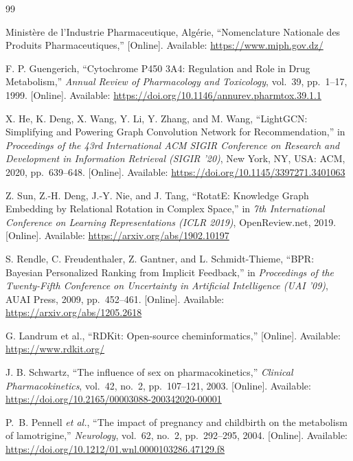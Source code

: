 \begin{thebibliography}{99}

Ministère de l'Industrie Pharmaceutique, Algérie,
``Nomenclature Nationale des Produits Pharmaceutiques,''
[Online]. Available: \url{https://www.miph.gov.dz/}

F. P. Guengerich,
``Cytochrome P450 3A4: Regulation and Role in Drug Metabolism,''
\textit{Annual Review of Pharmacology and Toxicology}, vol.~39, pp.~1--17, 1999.
[Online]. Available: \url{https://doi.org/10.1146/annurev.pharmtox.39.1.1}

X. He, K. Deng, X. Wang, Y. Li, Y. Zhang, and M. Wang,
``LightGCN: Simplifying and Powering Graph Convolution Network for Recommendation,''
in \textit{Proceedings of the 43rd International ACM SIGIR Conference on Research and Development in Information Retrieval (SIGIR '20)},
New York, NY, USA: ACM, 2020, pp.~639--648.
[Online]. Available: \url{https://doi.org/10.1145/3397271.3401063}

Z. Sun, Z.-H. Deng, J.-Y. Nie, and J. Tang,
``RotatE: Knowledge Graph Embedding by Relational Rotation in Complex Space,''
in \textit{7th International Conference on Learning Representations (ICLR 2019)},
OpenReview.net, 2019.
[Online]. Available: \url{https://arxiv.org/abs/1902.10197}

S. Rendle, C. Freudenthaler, Z. Gantner, and L. Schmidt-Thieme,
``BPR: Bayesian Personalized Ranking from Implicit Feedback,''
in \textit{Proceedings of the Twenty-Fifth Conference on Uncertainty in Artificial Intelligence (UAI '09)},
AUAI Press, 2009, pp.~452--461.
[Online]. Available: \url{https://arxiv.org/abs/1205.2618}

G. Landrum et al.,
``RDKit: Open-source cheminformatics,''
[Online]. Available: \url{https://www.rdkit.org/}

J. B. Schwartz,
``The influence of sex on pharmacokinetics,''
\textit{Clinical Pharmacokinetics}, vol.~42, no.~2, pp.~107--121, 2003.
[Online]. Available: \url{https://doi.org/10.2165/00003088-200342020-00001}

P.~B. Pennell \textit{et al.},
``The impact of pregnancy and childbirth on the metabolism of lamotrigine,''
\textit{Neurology}, vol.~62, no.~2, pp.~292--295, 2004.
[Online]. Available: \url{https://doi.org/10.1212/01.wnl.0000103286.47129.f8}


\end{thebibliography}
